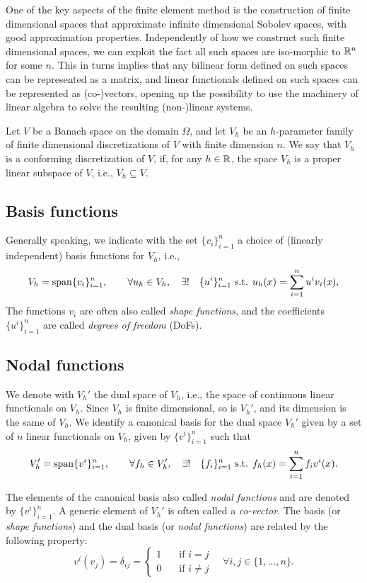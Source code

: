 One of the key aspects of the finite element method is the construction of
finite dimensional spaces that approximate infinite dimensional Sobolev spaces,
with good approximation properties. Independently of how we construct such
finite dimensional spaces, we can exploit the fact all such spaces are
iso-morphic to $\mathbb{R}^n$ for some $n$. This in turns implies that any bilinear form
defined on such spaces can be represented as a matrix, and linear functionals
defined on such spaces can be represented as (co-)vectors, opening up the
possibility to use the machinery of linear algebra to solve the resulting
(non-)linear systems.

Let $V$ be a Banach space on the domain $\Omega$, and let $V_h$ be an $h$-parameter family of finite dimensional discretizations of $V$ with finite dimension $n$. We say that $V_h$ is a conforming discretization of $V$, if, for any $h\in \mathbb{R}$, the space $V_h$ is a proper linear subspace of $V$, i.e., $V_h \subseteq V$. 

\subsection{Basis functions}

Generally speaking, we indicate with the set $\{v_i\}_{i=1}^n$ a choice of (linearly independent) basis functions for $V_h$, i.e., 
\[
V_h = \operatorname{span}\{v_i\}_{i=1}^n, \qquad \forall u_h \in V_h , \quad \exists! \quad \{u^i\}_{i=1}^n \text{ s.t. } u_h(x) = \sum_{i=1}^n u^i v_i(x),
\]
The functions $v_i$ are often also called \emph{shape functions}, and the coefficients $\{u^i\}_{i=1}^n$ are called \emph{degrees of freedom} (DoFs).

\subsection{Nodal functions}

We denote with $V_h'$ the dual space of $V_h$, i.e., the space of continuous linear functionals on $V_h$. Since $V_h$ is finite dimensional, so is $V_h'$, and its dimension is the same of $V_h$. We identify a canonical basis for the dual space $V_h'$ given by a set of $n$ linear functionals on $V_h$, given by $\{v^i\}_{i=1}^n$ such that 
\[
V_h' = \operatorname{span}\{v^i\}_{i=1}^n, \qquad \forall f_h \in V_h', \quad \exists! \quad \{f_i\}_{i=1}^n \text{ s.t. } f_h(x) = \sum_{i=1}^n f_i v^i(x).
\]

The elements of the canonical basis also called \emph{nodal functions} and are
denoted by $\{v^i\}_{i=1}^n$. A generic element of $V_h'$ is often called a
\emph{co-vector}. The basis (or \emph{shape functions}) and the dual basis (or
\emph{nodal functions}) are related by the following property:
\[
v^i(v_j) = \delta_{ij} = \begin{cases}
1 \quad &\text{if } i=j \\
0 \quad &\text{if } i\ne j
\end{cases}
\quad \forall i,j \in \{1,\dots,n\}.
\]

